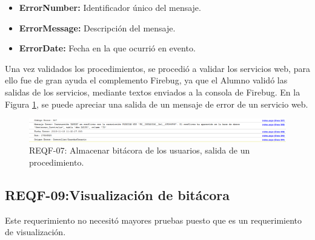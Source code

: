 \begin{itemize}
	\item \textbf{ErrorNumber:} Identificador único del mensaje.
	\item \textbf{ErrorMessage:} Descripción del mensaje.
	\item \textbf{ErrorDate:} Fecha en la que ocurrió en evento.
\end{itemize}

Una vez  validados los procedimientos, se procedió  a validar los servicios web, para ello fue de gran ayuda el complemento Firebug, ya que el Alumno validó las salidas de los servicios, mediante textos enviados  a la consola de Firebug. En la Figura \ref{REQF-09}, se puede apreciar una salida de un mensaje de error de un servicio web.

\begin{figure}[H]
	\centering
	\includegraphics[width=1\textwidth]{images/Capitulo_5/REQF-09.png}
	\caption[REQF-09: Almacenar bitácora de los usuarios, salida de un procedimiento. ]{REQF-07: Almacenar bitácora de los usuarios, salida de un procedimiento. }
	\label{REQF-09}
\end{figure}
\subsection{REQF-09:Visualización de bitácora}

Este requerimiento no necesitó mayores pruebas puesto que es un requerimiento de visualización.